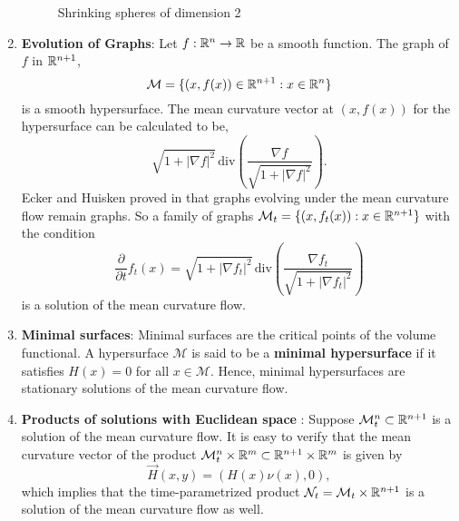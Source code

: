 \begin{enumerate}
\begin{figure}[h]
        \caption{Shrinking spheres of dimension 2}
    \end{figure}
    \item \textbf{Evolution of Graphs}: Let $ f : \mathbb{R}^{n} \to \mathbb{R} $ be a smooth function. The graph of $ f $ in $ \mathbb{R}^{n+1} $, 
    \[ \mathcal{M} = \{(x,f(x)) \in \mathbb{R}^{n+1} :  x \in \mathbb{R}^{n} \} \]
    is a smooth hypersurface. The mean curvature vector at $ (x,f(x)) $ for the hypersurface can be calculated to be,
    \[ \sqrt{1+ |\nabla f|^{2}} \, \text{div} \left( \frac{\nabla f}{\sqrt{1+ |\nabla f|^{2}}} \right).\]
    Ecker and Huisken proved in \cite{ecker1989mean} that graphs evolving under the mean curvature flow remain graphs. So a family of graphs $ \mathcal{M}_{t} = \{(x,f_{t}(x)) :  x \in \mathbb{R}^{n+1}\} $ with the condition 
    \[ \frac{\partial}{ \partial t}f_{t}(x) = \sqrt{1+ |\nabla f_{t}|^{2}} \, \text{div} \left( \frac{\nabla f_{t}}{\sqrt{1+ |\nabla f_{t}|^{2}}} \right) \]
    is a solution of the mean curvature flow. 
    \item \textbf{Minimal surfaces}: Minimal surfaces are the critical points of the volume functional. A hypersurface $ \mathcal{M} $ is said to be a \textbf{minimal hypersurface} if it satisfies $ H(x) = 0 $ for all $ x \in \mathcal{M}  $. Hence, minimal hypersurfaces are stationary solutions of the mean curvature flow. 
    \item \textbf{Products of solutions with Euclidean space}
    : Suppose $ \mathcal{M}_{t}^{n} \subset \mathbb{R}^{n+1} $ is a solution of the mean curvature flow. It is easy to verify that the mean curvature vector of the product $ \mathcal{M}_{t}^{n} \times \mathbb{R}^{m} \subset \mathbb{R}^{n+1} \times\mathbb{R}^{m}  $ is given by 
    \[ \vec{H}(x,y) = (H(x) \nu(x), 0), \]
    which implies that the time-parametrized product $ \mathcal{N}_{t} = \mathcal{M}_{t} \times \mathbb{R}^{n+1} $ is a solution of the mean curvature flow as well.

\end{enumerate}
